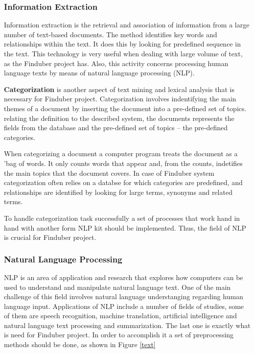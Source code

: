 \subsubsection{Information Extraction}

Information extraction is the retrieval and association of information from a large number of text-based documents. The method identifies key words and relationships within the text. It does this by looking for predefined sequence in the text. This technology is very useful when dealing with large volume of text, as the Finduber project has. Also, this activity concerns processing human language texts by means of natural language processing (NLP). 

\textbf{Categorization} is another aspect of text mining and lexical analysis that is necessary for Finduber project. Categorization involves indentifying the main themes of a document by inserting the document into a pre-defined set of topics. relating the definition to the described system, the documents represents the fields from the database and the pre-defined set of topics -- the pre-defined categories. 

When categorizing a document a computer program treats the document as a 'bag of words. It only counts words that appear and, from the counts, indetifies the main topics that the document covers. In case of Finduber system categorization often relies on a databse for which categories are predefined, and relationships are identified by looking for large terms, synonyms and related terms.

To handle categorization task successfully a set of processes that work hand in hand with another form NLP kit should be implemented. Thus, the field of NLP is crucial for Finduber project.

\subsubsection{Natural Language Processing}

NLP is an area of application and research that explores how computers can be used to understand and manipulate natural language text. One of the main challenge of this field involves natural language understanging regarding human language input. Applications of NLP include a number of fields of studies, some of them are speech recognition, machine translation, artificial intelligence and natural language text processing and summarization. The last one is exactly what is need for Finduber project. In order to accomplish it a set of preprocessing methods should be done, as shown in Figure \ref{text}

